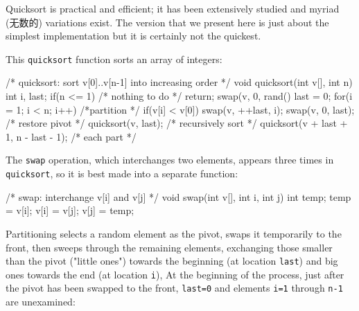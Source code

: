 Quicksort is practical and efficient; it has been extensively studied and
myriad (无数的) variations exist. The version that we present here is
just about the simplest implementation but it is certainly not the
quickest.

This \verb'quicksort' function sorts an array of integers:
\begin{wellcode}
    /* quicksort: sort v[0]..v[n-1] into increasing order */
    void quicksort(int v[], int n)
    {
        int i, last;
        if(n <= 1) /* nothing to do */
            return;
        swap(v, 0, rand() %
        last = 0;
        for(i = 1; i < n; i++)  /*partition */
            if(v[i] < v[0])
                swap(v, ++last, i);
        swap(v, 0, last);   /* restore pivot */
        quicksort(v, last); /* recursively sort */
        quicksort(v + last + 1, n - last - 1); /* each part */
    }
\end{wellcode}
The \verb'swap' operation, which interchanges two elements, appears three
times in \verb'quicksort', so it is best made into a separate function:
\begin{wellcode}
    /* swap: interchange v[i] and v[j] */
    void swap(int v[], int i, int j)
    {
        int temp;
        temp = v[i];
        v[i] = v[j];
        v[j] = temp;
    }
\end{wellcode}

Partitioning selects a random element as the pivot, swaps it temporarily to
the front, then sweeps through the remaining elements, exchanging those
smaller than the pivot ("little ones") towards the beginning (at location
\verb'last') and big ones towards the end (at location \verb'i'), At the
beginning of the process, just after the pivot has been swapped to the
front, \verb'last=0' and elements \verb'i=1' through \verb'n-1' are
unexamined: \\
\begin{center}
\end{center}

